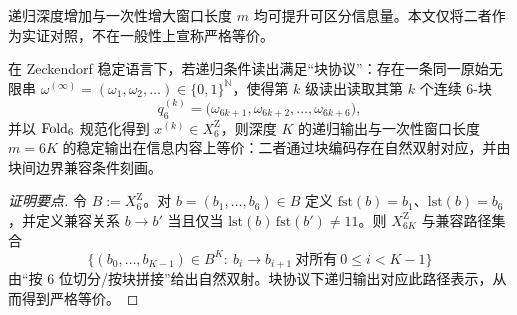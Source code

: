 \begin{proposition}\label{prop:fw-rec-R3}
递归深度增加与一次性增大窗口长度 $m$ 均可提升可区分信息量。本文仅将二者作为实证对照，不在一般性上宣称严格等价。
\end{proposition}

\begin{proposition}\label{prop:fw-rec-R4-block-equivalence}
在 Zeckendorf 稳定语言下，若递归条件读出满足“块协议”：存在一条同一原始无限串 $\omega^{(\infty)}=(\omega_1,\omega_2,\dots)\in\{0,1\}^{\mathbb{N}}$，使得第 $k$ 级读出读取其第 $k$ 个连续 6-块
\[
q_6^{(k)}=\bigl(\omega_{6k+1},\omega_{6k+2},\dots,\omega_{6k+6}\bigr),
\]
并以 $\mathrm{Fold}_6$ 规范化得到 $x^{(k)}\in X_6^{\mathrm Z}$，则深度 $K$ 的递归输出与一次性窗口长度 $m=6K$ 的稳定输出在信息内容上等价：二者通过块编码存在自然双射对应，并由块间边界兼容条件刻画。
\end{proposition}

\begin{proof}[证明要点]
令 $B:=X_6^{\mathrm Z}$。对 $b=(b_1,\dots,b_6)\in B$ 定义 $\mathrm{fst}(b)=b_1$、$\mathrm{lst}(b)=b_6$，并定义兼容关系 $b\to b'$ 当且仅当 $\mathrm{lst}(b)\,\mathrm{fst}(b')\neq 11$。则 $X_{6K}^{\mathrm Z}$ 与兼容路径集合
\[
\{(b_0,\dots,b_{K-1})\in B^K:\ b_i\to b_{i+1}\ \text{对所有}\ 0\le i<K-1\}
\]
由“按 6 位切分/按块拼接”给出自然双射。块协议下递归输出对应此路径表示，从而得到严格等价。
\end{proof}

